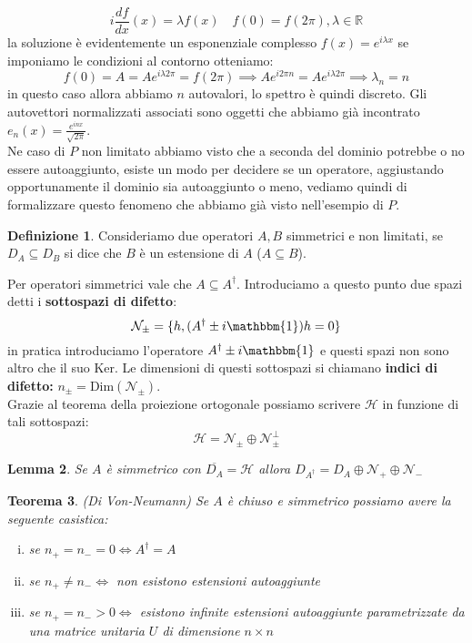 \documentclass[12pt]{book}
\theoremstyle{plain}
\newcommand{\R}{\mathbb{R}}
\renewcommand{\H}{\mathcal{H}}
\newtheorem{thm}{Teorema}[section]
\newtheorem{lem}[thm]{Lemma}
\theoremstyle{definition}
\newtheorem{dfn}[thm]{Definizione}
\theoremstyle{remark}
\begin{document}
\[i\frac{df}{dx}(x) = \lambda f(x)\quad f(0)=f(2\pi),\lambda\in\R\]
la soluzione è evidentemente un esponenziale complesso $f(x) = e^{i\lambda x}$ se imponiamo le condizioni al contorno otteniamo:
\[f(0) = A = Ae^{i\lambda 2\pi} = f(2\pi) \implies  Ae^{i2\pi n} = Ae^{i\lambda 2\pi} \implies \lambda_n = n\]
in questo caso allora abbiamo $n$ autovalori, lo spettro è quindi discreto. Gli autovettori normalizzati associati sono oggetti che abbiamo già incontrato $e_n(x) = \frac{e^{inx}}{\sqrt{2\pi}}$.\\
Ne caso di $P$ non limitato abbiamo visto che a seconda del dominio potrebbe o no essere autoaggiunto, esiste un modo per decidere se un operatore, aggiustando opportunamente il dominio sia autoaggiunto o meno, vediamo quindi di formalizzare questo fenomeno che abbiamo già visto nell'esempio di $P$. 
\begin{dfn}
Consideriamo due operatori $A,B$ simmetrici e non limitati, se $D_A \subseteq D_B$ si dice che $B$ è un estensione di $A$ ($A\subseteq B$).
\end{dfn}
Per operatori simmetrici vale che $A\subseteq A^\dagger$. Introduciamo a questo punto due spazi detti i \textbf{sottospazi di difetto}:
\[\mathcal{N}_\pm = \{h,(A^\dagger\pm i \mathbbm{1})h = 0\}\]
in pratica introduciamo l'operatore $A^\dagger\pm i \mathbbm{1}$ e questi spazi non sono altro che il suo Ker. Le dimensioni di questi sottospazi si chiamano \textbf{indici di difetto:} $n_\pm = \text{Dim}(\mathcal{N}_\pm)$.\\
Grazie al teorema della proiezione ortogonale possiamo scrivere $\H$ in funzione di tali sottospazi:
\[\H =\mathcal{N}_\pm \oplus \mathcal{N}_\pm^\perp \]
\begin{lem}
\label{lemmaacaso}
Se $A$ è simmetrico con $\overline{D_A}=\H$ allora $D_{A^\dagger} = D_A\oplus\mathcal{N}_+\oplus \mathcal{N}_- $
\end{lem}
\begin{thm}
(Di Von-Neumann) Se $A$ è chiuso e simmetrico possiamo avere la seguente casistica:
\begin{enumerate}[i.]
\item se $n_+ = n_- =0 \iff A^\dagger = A$
\item se $n_+\neq n_- \iff$ non esistono estensioni autoaggiunte
\item se $n_+=n_->0 \iff$ esistono infinite estensioni autoaggiunte parametrizzate da una matrice unitaria $U$ di dimensione $n\times n$
\end{enumerate}
\end{thm}
\end{document}
